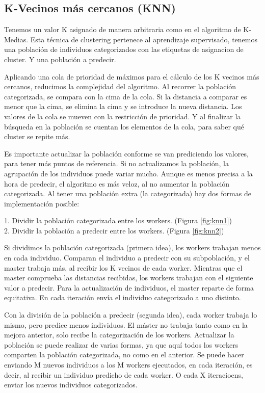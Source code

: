		
	\subsection{K-Vecinos más cercanos (KNN)}
		Tenemos un valor K  asignado de manera arbitraria como en el algoritmo de K-Medias. Esta técnica de clustering pertenece al aprendizaje supervisado, tenemos una población de individuos categorizados con las etiquetas de asignacion de cluster. Y una población a predecir.
		
		Aplicando una cola de prioridad de máximos para el cálculo de los K vecinos más cercanos, reducimos la complejidad del algoritmo. Al recorrer la población categorizada, se compara con la cima de la cola. Si la distancia a comparar es menor que la cima, se elimina la cima y se introduce la nueva distancia. Los valores de la cola se mueven con la restricción de prioridad. Y al finalizar la búsqueda en la población se cuentan los elementos de la cola, para saber qué cluster se repite más.
		
		Es importante actualizar la población conforme se van prediciendo los valores, para tener más puntos de referencia. Si no actualizamos la población, la agrupación de los individuos puede variar mucho. Aunque es menos precisa a la hora de predecir, el algoritmo es más veloz, al no aumentar la población categorizada. Al tener una población extra (la categorizada) hay dos formas de implementación posible:
		
		
		\begin{flushleft}
			1. Dividir la población categorizada entre los workers. (Figura \ref{fig:knn1})\\
			2. Dividir la población a predecir entre los workers. (Figura \ref{fig:knn2})
		\end{flushleft}
		
		Si dividimos la población categorizada (primera idea), los workers trabajan menos en cada individuo. Comparan el individuo a predecir con su subpoblación, y el master trabaja más, al recibir los K vecinos de cada worker.  Mientras que el master comprueba las distancias recibidas, los workers trabajan con el siguiente valor a predecir. Para la actualización de individuos, el master reparte de forma equitativa. En cada iteración envía el individuo categorizado a uno distinto.
		
		Con la división de la población a predecir (segunda idea), cada worker trabaja lo mismo, pero predice menos individuos. El máster no trabaja tanto como en la mejora anterior, solo recibe la categorización de los workers. Actualizar la población se puede realizar de varias formas, ya que aquí todos los workers comparten la población categorizada, no como en el anterior. Se puede hacer enviando M nuevos individuos a los M workers ejecutados, en cada iteración, es decir, al recibir un individuo predicho de cada worker. O cada X iteracioens, enviar los nuevos individuos categorizados.
		

